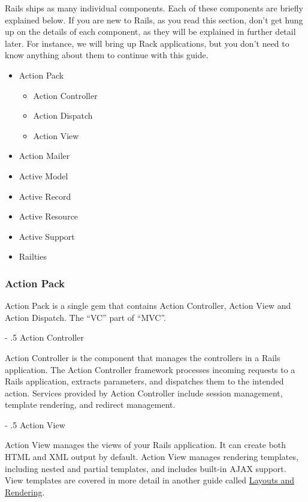 \documentclass[10pt]{book}
\makeatletter
\renewcommand\paragraph{%
   \@startsection{paragraph}{4}{0mm}%
      {-\baselineskip}%
      {.5\baselineskip}%
      {\normalfont\scriptsize\bfseries}}
\makeatother
\begin{document}
Rails ships as many individual components.  Each of these components are briefly explained below.  If you are new to Rails, as you read this section, don’t get hung up on the details of each component, as they will be explained in further detail later.  For instance, we will bring up Rack applications, but you don’t need to know anything about them to continue with this guide.
\begin{itemize}
	\item Action Pack  
\begin{itemize}
	\item Action Controller
	\item Action Dispatch
	\item Action View
\end{itemize}
	\item Action Mailer
	\item Active Model
	\item Active Record
	\item Active Resource
	\item Active Support
	\item Railties
\end{itemize}

\subsubsection{ Action Pack}

Action Pack is a single gem that contains Action Controller, Action View and Action Dispatch. The “VC” part of “MVC”.

\paragraph{ Action Controller}

Action Controller is the component that manages the controllers in a Rails application. The Action Controller framework processes incoming requests to a Rails application, extracts parameters, and dispatches them to the intended action.  Services provided by Action Controller include session management, template rendering, and redirect management.

\paragraph{ Action View}

Action View manages the views of your Rails application. It can create both HTML and XML output by default. Action View manages rendering templates, including nested and partial templates, and includes built-in AJAX support.  View templates are covered in more detail in another guide called \href{http://guides.rubyonrails.org/layouts_and_rendering.html}{Layouts and Rendering}.
\end{document}
